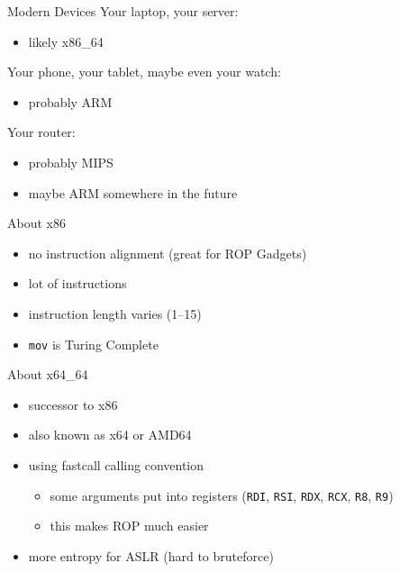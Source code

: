 \documentclass[beamer]{uibk}
\begin{document}
\begin{frame}{Modern Devices}
    Your laptop, your server:
    \begin{itemize}
        \item likely x86\_64
    \end{itemize}
    \medskip
    \pause
    Your phone, your tablet, maybe even your watch:
    \begin{itemize}
        \item probably ARM
    \end{itemize}
    \medskip
    \pause
    Your router:
    \begin{itemize}
        \item probably MIPS
        \item maybe ARM somewhere in the future
    \end{itemize}
\end{frame}

\begin{frame}{About x86}
    \begin{itemize}
        \item no instruction alignment (great for ROP Gadgets)
        \item lot of instructions
        \item instruction length varies (\SIrange{1}{15}{\byte})
        \item \texttt{mov} is Turing Complete
    \end{itemize}
\end{frame}

\begin{frame}{About x64\_64}
    \begin{itemize}
        \item successor to x86
        \item also known as x64 or AMD64
        \item using fastcall calling convention
            \begin{itemize}
                \item some arguments put into registers (\texttt{RDI},
                    \texttt{RSI}, \texttt{RDX}, \texttt{RCX}, \texttt{R8},
                    \texttt{R9})
                \item this makes ROP much easier
            \end{itemize}
        \item more entropy for ASLR (hard to bruteforce)
    \end{itemize}
\end{frame}
\end{document}
